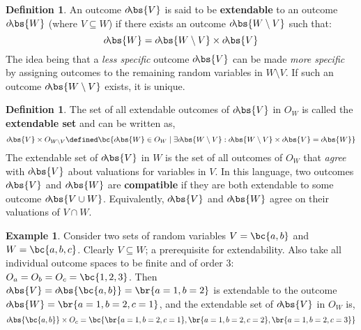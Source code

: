 \documentclass[aps, 10pt, english, twoside, pra, nofootinbib, longbibliography]{revtex4-1}
\theoremstyle{plain}
\theoremstyle{definition}
\newtheorem{definition}[theorem]{Definition}
\newtheorem{example}[theorem]{Example}
\theoremstyle{remark}
\newcommand{\term}[1]{\textcolor{Mahogany}{\textbf{#1}}}
\newcommand{\outc}[1]{o\!\bs{#1}}
\begin{document}
    \begin{definition}
        \label{def:extendable}
        An outcome $\outc{V}$ is said to be \term{extendable} to an outcome $\outc{W}$ (where $V \subseteq W$) if there exists an outcome $\outc{W\setminus V}$ such that:
        \[ \outc{W} = \outc{W\setminus V} \times \outc{V} \]
        The idea being that a \textit{less specific} outcome $\outc{V}$ can be made \textit{more specific} by assigning outcomes to the remaining random variables in $W \setminus V$. If such an outcome $\outc{W\setminus V}$ exists, it is unique.
    \end{definition}

    \begin{definition}
        The set of all extendable outcomes of $\outc{V}$ in $O_{W}$ is called the \term{extendable set} and can be written as,
        \[ \outc{V} \times O_{W\setminus V} \defined \bc{\outc{W} \in O_{W} \mid \exists \outc{W\setminus V} : \outc{W\setminus V} \times \outc{V} = \outc{W}} \]
        The extendable set of $\outc{V}$ in $W$ is the set of all outcomes of $O_W$ that \textit{agree} with $\outc{V}$ about valuations for variables in $V$. In this language, two outcomes $\outc{V}$ and $\outc{W}$ are \term{compatible} if they are both extendable to some outcome $\outc{V \cup W}$. Equivalently, $\outc{V}$ and $\outc{W}$ agree on their valuations of $V \cap W$.
    \end{definition}

    \begin{example}
        Consider two sets of random variables $V = \bc{a, b}$ and $W = \bc{a, b, c}$. Clearly $V \subseteq W$; a prerequisite for extendability. Also take all individual outcome spaces to be finite and of order 3: $O_a = O_b = O_c = \bc{1,2,3}$. Then $\outc{V} = \outc{\bc{a,b}} = \br{a = 1, b = 2}$ is extendable to the outcome $\outc{W} = \br{a = 1, b = 2, c = 1}$, and the extendable set of $\outc{V}$ in $O_{W}$ is,
        \[ \outc{\bc{a,b}} \times O_c = \bc{\br{a = 1, b = 2, c = 1}, \br{a = 1, b = 2, c = 2}, \br{a = 1, b = 2, c = 3}} \]
    \end{example}

\end{document}
